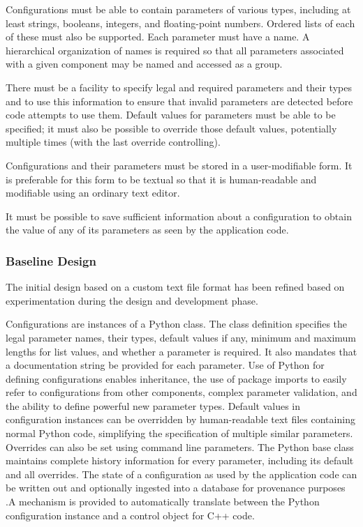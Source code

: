 \documentclass[DM,lsstdraft,toc]{lsstdoc}
\begin{document}
Configurations must be able to contain parameters of various types,
including at least strings, booleans, integers, and floating-point
numbers. Ordered lists of each of these must also be supported. Each
parameter must have a name. A hierarchical organization of names is
required so that all parameters associated with a given component may be
named and accessed as a group.

There must be a facility to specify legal and required parameters and
their types and to use this information to ensure that invalid
parameters are detected before code attempts to use them. Default values
for parameters must be able to be specified; it must also be possible to
override those default values, potentially multiple times (with the last
override controlling).

Configurations and their parameters must be stored in a user-modifiable
form. It is preferable for this form to be textual so that it is
human-readable and modifiable using an ordinary text editor.

It must be possible to save sufficient information about a configuration
to obtain the value of any of its parameters as seen by the application
code.

\subsubsection{Baseline Design}\label{configuration-design}

The initial design based on a custom text file format has been refined
based on experimentation during the design and development phase.

Configurations are instances of a Python class. The class definition
specifies the legal parameter names, their types, default values if any,
minimum and maximum lengths for list values, and whether a parameter is
required. It also mandates that a documentation string be provided for
each parameter. Use of Python for defining configurations enables
inheritance, the use of package imports to easily refer to
configurations from other components, complex parameter validation, and
the ability to define powerful new parameter types. Default values in
configuration instances can be overridden by human-readable text files
containing normal Python code, simplifying the specification of multiple
similar parameters. Overrides can also be set using command line
parameters. The Python base class maintains complete history information
for every parameter, including its default and all overrides. The state
of a configuration as used by the application code can be written out
and optionally ingested into a database for provenance purposes .A
mechanism is provided to automatically translate between the Python
configuration instance and a control object for C++ code.
\end{document}
